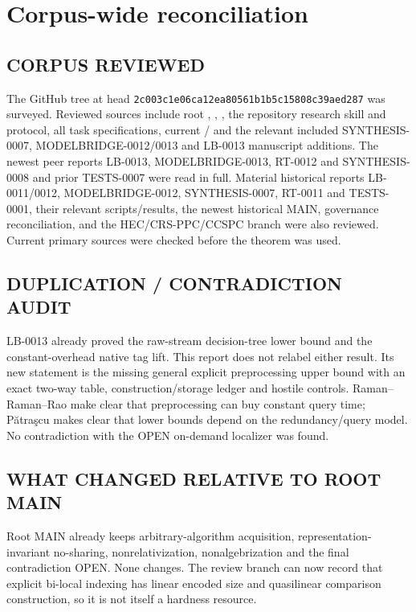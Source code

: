 \documentclass[11pt]{article}
\begin{document}
\section{Corpus-wide reconciliation}

\subsection*{CORPUS REVIEWED}
The GitHub tree at head \texttt{2c003c1e06ca12ea80561b1b5c15808c39aed287}
was surveyed.  Reviewed sources include root ,
, , the repository research skill and
protocol, all task specifications, current /
and the relevant included SYNTHESIS-0007, MODELBRIDGE-0012/0013 and LB-0013
manuscript additions.  The newest peer reports LB-0013, MODELBRIDGE-0013,
RT-0012 and SYNTHESIS-0008 and prior TESTS-0007 were read in full.
Material historical reports LB-0011/0012, MODELBRIDGE-0012, SYNTHESIS-0007,
RT-0011 and TESTS-0001, their relevant scripts/results, the newest historical
MAIN, governance reconciliation, and the HEC/CRS-PPC/CCSPC branch were also
reviewed.  Current primary sources were checked before the theorem was used.

\subsection*{DUPLICATION / CONTRADICTION AUDIT}
LB-0013 already proved the raw-stream decision-tree lower bound and the
constant-overhead native tag lift.  This report does not relabel either
result.  Its new statement is the missing general explicit preprocessing
upper bound with an exact two-way table, construction/storage ledger and
hostile controls.  Raman--Raman--Rao make clear that preprocessing can buy
constant query time; P\u{a}tra\c{s}cu makes clear that lower bounds depend on
the redundancy/query model.  No contradiction with the OPEN on-demand
localizer was found.

\subsection*{WHAT CHANGED RELATIVE TO ROOT MAIN}
Root MAIN already keeps arbitrary-algorithm acquisition, representation-
invariant no-sharing, nonrelativization, nonalgebrization and the final
contradiction OPEN.  None changes.  The review branch can now record that
explicit bi-local indexing has linear encoded size and quasilinear
comparison construction, so it is not itself a hardness resource.
\end{document}
